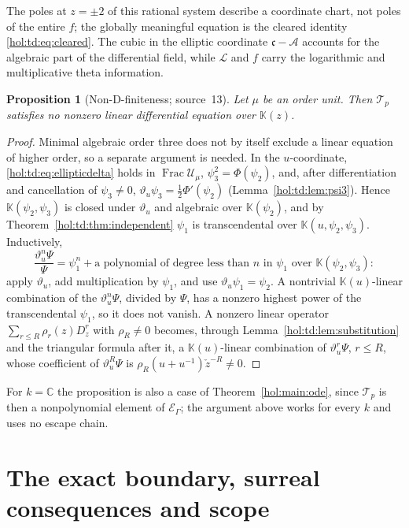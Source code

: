 \documentclass[11pt]{article}
\numberwithin{equation}{section}
\newtheorem{proposition}[theorem]{Proposition}
\theoremstyle{definition}
\theoremstyle{remark}
\newcommand{\C}{\mathbb C}
\newcommand{\E}{\mathcal E_\Gamma}
\newcommand{\KK}{\mathbb K}
\begin{document}
The poles at $z=\pm2$ of this rational system describe a coordinate chart,
not poles of the entire $f$; the globally meaningful equation is the cleared
identity \eqref{hol:td:eq:cleared}. The cubic in the elliptic coordinate
$\mathfrak c-\mathcal A$ accounts for the algebraic part of the differential
field, while $\mathcal L$ and $f$ carry the logarithmic and multiplicative
theta information.

\begin{proposition}[Non-D-finiteness; source~13]\label{hol:td:prop:nondfinite}
Let $\mu$ be an order unit. Then $\mathcal T_p$ satisfies no nonzero linear
differential equation over $\KK(z)$.
\end{proposition}

\begin{proof}
Minimal algebraic order three does not by itself exclude a linear equation of
higher order, so a separate argument is needed. In the $u$-coordinate,
\eqref{hol:td:eq:ellipticdelta} holds in $\operatorname{Frac}\mathcal U_\mu$,
$\psi_3^2=\Phi(\psi_2)$, and,
after differentiation and cancellation of $\psi_3\ne0$,
$\vartheta_u\psi_3=\frac12\Phi'(\psi_2)$
(Lemma~\ref{hol:td:lem:psi3}). Hence $\KK(\psi_2,\psi_3)$ is closed
under $\vartheta_u$ and algebraic over $\KK(\psi_2)$, and by
Theorem~\ref{hol:td:thm:independent} $\psi_1$ is transcendental over
$\KK(u,\psi_2,\psi_3)$. Inductively,
\[
 \frac{\vartheta_u^n\Psi}{\Psi}=\psi_1^n+\text{a polynomial of degree less
 than }n\text{ in }\psi_1\text{ over }\KK(\psi_2,\psi_3):
\]
apply $\vartheta_u$, add multiplication by $\psi_1$, and use
$\vartheta_u\psi_1=\psi_2$. A nontrivial $\KK(u)$-linear combination of the
$\vartheta_u^n\Psi$, divided by $\Psi$, has a nonzero highest power of the
transcendental $\psi_1$, so it does not vanish. A nonzero linear operator
$\sum_{r\le R}\rho_r(z)D_z^r$ with $\rho_R\ne0$ becomes, through
Lemma~\ref{hol:td:lem:substitution} and the triangular formula after it, a
$\KK(u)$-linear combination of $\vartheta_u^r\Psi$, $r\le R$, whose coefficient
of $\vartheta_u^R\Psi$ is $\rho_R(u+u^{-1})\check z^{-R}\ne0$.
\end{proof}

For $k=\C$ the proposition is also a case of Theorem~\ref{hol:main:ode}, since
$\mathcal T_p$ is then a nonpolynomial element of $\E$; the argument above
works for every $k$ and uses no escape chain.

\section{The exact boundary, surreal consequences and scope}
\label{hol:td:sec:boundary}
\end{document}

